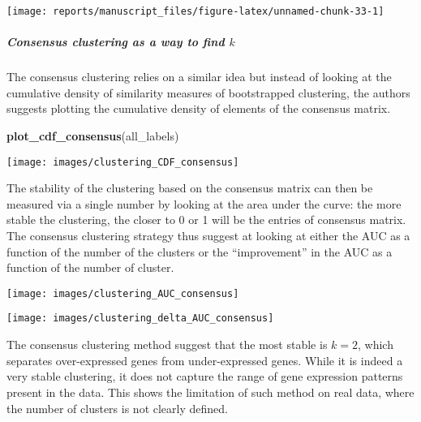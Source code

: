 \documentclass[9pt,a4paper,]{extarticle}
\newenvironment{Shaded}{\begin{snugshade}}{\end{snugshade}}
\newcommand{\KeywordTok}[1]{\textcolor[rgb]{0.13,0.29,0.53}{\textbf{#1}}}
\newcommand{\NormalTok}[1]{#1}
\begin{document}
\begin{center}\texttt{[image: reports/manuscript\_files/figure-latex/unnamed-chunk-33-1]} \end{center}

\hypertarget{consensus-clustering-as-a-way-to-find-k}{%
\subparagraph{\texorpdfstring{Consensus clustering as a way to find \(k\)}{Consensus clustering as a way to find k}}\label{consensus-clustering-as-a-way-to-find-k}}

The consensus clustering \citep{monti:consensus} relies on a similar idea but
instead of looking at the cumulative density of similarity measures of
bootstrapped clustering, the authors suggests plotting the cumulative density
of elements of the consensus matrix.

\begin{Shaded}
\begin{Highlighting}[]
\KeywordTok{plot_cdf_consensus}\NormalTok{(all_labels)}
\end{Highlighting}
\end{Shaded}

\begin{center}\texttt{[image: images/clustering\_CDF\_consensus]} \end{center}

The stability of the clustering based on the consensus matrix can then be
measured via a single number by looking at the area under the curve: the more
stable the clustering, the closer to 0 or 1 will be the entries of consensus
matrix. The consensus clustering strategy thus suggest at looking at either
the AUC as a function of the number of the clusters or the ``improvement'' in
the AUC as a function of the number of cluster.

\begin{center}\texttt{[image: images/clustering\_AUC\_consensus]} \end{center}

\begin{center}\texttt{[image: images/clustering\_delta\_AUC\_consensus]} \end{center}

The consensus clustering method suggest that the most stable is \(k=2\), which
separates over-expressed genes from under-expressed genes. While it is indeed
a very stable clustering, it does not capture the range of gene expression
patterns present in the data. This shows the limitation of such method on real
data, where the number of clusters is not clearly defined.
\end{document}
